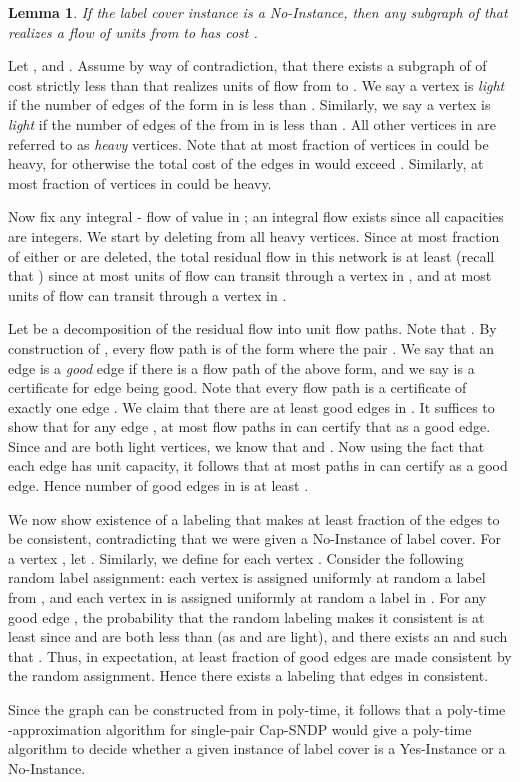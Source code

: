 \documentclass[11pt]{article}
\newcounter{thm0Rcopies}
\newcounter{thm_saved}
\newtheorem{lemma}{Lemma}[section]
\newcommand{\yes}{{\sc Yes-Instance}\xspace}
\newcommand{\no}{{\sc No-Instance}\xspace}
\renewenvironment{proof}{\vspace{-0.1in}\noindent{\bf Proof:}}{\hspace*{\fill}\par}
\begin{document}
\begin{lemma}\label{lem:no}
If the label cover instance is a \no,
then any subgraph of  that realizes a flow of  units from  to 
has cost .
\end{lemma}
\begin{proof}
 Let , and .  Assume by way of
  contradiction, that there exists a subgraph  of  of
  cost strictly less than  that realizes  units
  of flow from  to . We say a vertex  is {\em light} if
  the number of edges of the form  in
   is less than . Similarly, we say a vertex  is
  {\em light} if the number of edges of the from
   in  is less than . All
  other vertices in  are referred to as {\em heavy}
  vertices. Note that at most  fraction of vertices in  could
  be heavy, for otherwise the total cost of the edges in  would
  exceed . Similarly, at most  fraction of vertices in  could
  be heavy.

  Now fix any integral - flow  of value  in ; an
  integral flow exists since all capacities are integers. We start by
  deleting from  all heavy vertices.  Since at most 
  fraction of either  or  are deleted, the total residual flow
  in this network is at least 
  (recall that ) since at most  units of flow can
  transit through a vertex in , and at most  units of flow can
  transit through a vertex in .

  Let  be a decomposition of the residual flow into unit flow
  paths.  Note that .  By construction of , every flow
  path  is of the form  where the pair
  .  We say that an edge  is a {\em good} edge if there is a flow path  of the above
  form, and we say  is a certificate for edge  being good.
  Note that every flow path  is a certificate of exactly one edge
  .  We claim that there are at least  good
  edges in .  It suffices to show that for any edge ,
  at most  flow paths in  can certify that  as a
  good edge.  Since  and  are both light vertices, we know that
   and . Now using the
  fact that each edge  has unit capacity, it follows
  that at most  paths in  can certify  as a good
  edge.  Hence number of good edges in  is at least
  .

  We now show existence of a labeling  that makes at least
   fraction of the edges to be consistent,
  contradicting that we were given a \no of label cover. For a vertex
  , let .  Similarly, we define  for each vertex .
  Consider the following random label assignment: each vertex  is assigned uniformly at random a label from , and
  each vertex in  is assigned uniformly at random a label in
  . For any good edge , the probability that the
  random labeling makes it consistent is at least 
  since  and  are both less than  (as
   and  are light), and there exists an 
  and  such that .  Thus, in expectation, at least 
  fraction of good edges are made consistent by the random assignment.
  Hence there exists a labeling  that  edges in  consistent.
  \end{proof}
Since the graph  can be constructed from  in poly-time,
it follows that a poly-time -approximation algorithm
for single-pair Cap-SNDP would give a poly-time algorithm to
decide whether a given instance of label cover is a \yes or a \no.
\end{document}
